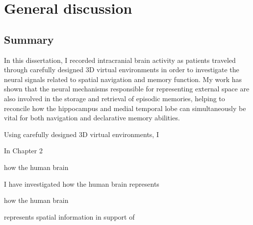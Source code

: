 \chapter{General discussion}
\large

\section{Summary}

In this dissertation, I recorded intracranial brain activity as patients traveled through carefully designed 3D virtual environments in order to investigate the neural signals related to spatial navigation and memory function. My work has shown that the neural mechanisms responsible for representing external space are also involved in the storage and retrieval of episodic memories, helping to reconcile how the hippocampus and medial temporal lobe can simultaneously be vital for both navigation and declarative memory abilities.









Using carefully designed 3D virtual environments, I 

In Chapter 2



 how the human brain 


I have investigated how the human brain represents 


 how the human brain 


represents spatial information in support of 